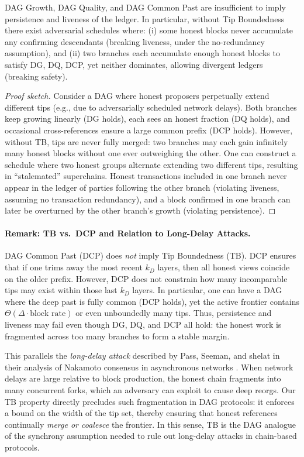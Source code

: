 \begin{lemma}
DAG Growth, DAG Quality, and DAG Common Past are insufficient to imply persistence
and liveness of the ledger. In particular, without Tip Boundedness there exist
adversarial schedules where: (i) some honest blocks never accumulate any confirming
descendants (breaking liveness, under the no-redundancy assumption), and (ii) two
branches each accumulate enough honest blocks to satisfy DG, DQ, DCP, yet neither
dominates, allowing divergent ledgers (breaking safety).
\end{lemma}

\begin{proof}[Proof sketch]
Consider a DAG where honest proposers perpetually extend different tips (e.g., due
to adversarially scheduled network delays). Both branches keep growing linearly
(DG holds), each sees an honest fraction (DQ holds), and occasional cross-references
ensure a large common prefix (DCP holds). However, without TB, tips are never fully
merged: two branches may each gain infinitely many honest blocks without one ever
outweighing the other. One can construct a schedule where two honest groups alternate
extending two different tips, resulting in ``stalemated'' superchains. Honest
transactions included in one branch never appear in the ledger of parties following
the other branch (violating liveness, assuming no transaction redundancy), and a
block confirmed in one branch can later be overturned by the other branch’s growth
(violating persistence).
\end{proof}

\paragraph{Remark: TB vs.\ DCP and Relation to Long-Delay Attacks.}
DAG Common Past (DCP) does \emph{not} imply Tip Boundedness (TB). DCP ensures that if one trims away the most recent $k_D$ layers, then all honest views coincide on the older prefix. However, DCP does not constrain how many incomparable tips may exist within those last $k_D$ layers. In particular, one can have a DAG where the deep past is fully common (DCP holds), yet the active frontier contains $\Theta(\Delta \cdot \text{block rate})$ or even unboundedly many tips. Thus, persistence and liveness may fail even though DG, DQ, and DCP all hold: the honest work is fragmented across too many branches to form a stable margin.

This parallels the \emph{long-delay attack} described by Pass, Seeman, and shelat in their analysis of Nakamoto consensus in asynchronous networks \cite[Section~8]{EC:PasSeeShe17}. When network delays are large relative to block production, the honest chain fragments into many concurrent forks, which an adversary can exploit to cause deep reorgs. Our TB property directly precludes such fragmentation in DAG protocols: it enforces a bound on the width of the tip set, thereby ensuring that honest references continually \emph{merge or coalesce} the frontier. In this sense, TB is the DAG analogue of the synchrony assumption needed to rule out long-delay attacks in chain-based protocols.


